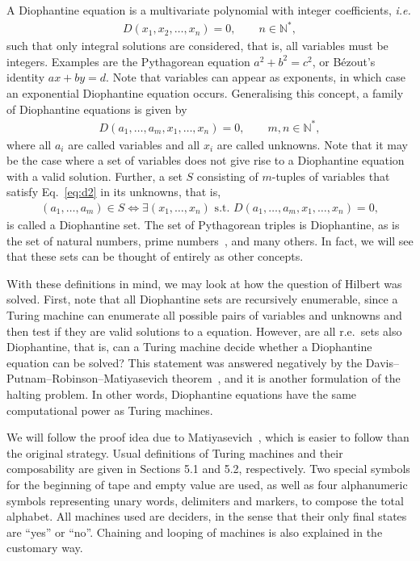\documentclass[12pt]{article}
\begin{document}
A Diophantine equation is a multivariate polynomial with integer coefficients,
\emph{i.e.}
\begin{align}
    D(x_{1}, x_{2}, \dots, x_{n}) = 0, \qquad n \in \mathbb{N}^{*},
        \label{eq:d1}
\end{align}
such that only integral solutions are considered, that is, all variables must
be integers. Examples are the Pythagorean equation $a^{2} + b^{2} = c^{2}$, or
Bézout's identity $ax + by = d$. Note that variables can appear as exponents,
in which case an exponential Diophantine equation occurs. Generalising this
concept, a family of Diophantine equations is given by
\begin{align}
    D(a_{1}, \dots, a_{m}, x_{1}, \dots, x_{n}) = 0, \qquad m, n \in
        \mathbb{N}^{*}, \label{eq:d2}
\end{align}
where all $a_{i}$ are called variables and all $x_{i}$ are called unknowns.
Note that it may be the case where a set of variables does not give rise to a
Diophantine equation with a valid solution. Further, a set $S$ consisting of
$m$-tuples of variables that satisfy Eq.~\ref{eq:d2} in its unknowns, that is,
\begin{align}
    (a_{1}, \dots, a_{m}) \in S \Leftrightarrow \exists (x_{1}, \dots, x_{n})
        \text{ s.t. } D(a_{1}, \dots, a_{m}, x_{1}, \dots, x_{n}) = 0,
\end{align}
is called a Diophantine set. The set of Pythagorean triples is Diophantine, as
is the set of natural numbers, prime numbers~\cite{Jones:article:1976:jun}, and
many others. In fact, we will see that these sets can be thought of entirely as
other concepts.

With these definitions in mind, we may look at how the question of Hilbert was
solved. First, note that all Diophantine sets are recursively enumerable, since
a Turing machine can enumerate all possible pairs of variables and unknowns and
then test if they are valid solutions to a equation. However, are all r.e.\ sets
also Diophantine, that is, can a Turing machine decide whether a Diophantine
equation can be solved? This statement was answered negatively by the
Davis--Putnam--Robinson--Matiyasevich
theorem~\cite{Matiyasevich:article:1970:jun}, and it is another formulation of
the halting problem. In other words, Diophantine equations have the same
computational power as Turing machines.

We will follow the proof idea due to Matiyasevich~\cite[Chap.
5]{Matiyasevich:book:1993}, which is easier to follow than the original
strategy. Usual definitions of Turing machines and their composability are
given in Sections 5.1 and 5.2, respectively. Two special symbols for the
beginning of tape and empty value are used, as well as four alphanumeric
symbols representing unary words, delimiters and markers, to compose the total
alphabet. All machines used are deciders, in the sense that their only final
states are ``yes'' or ``no''. Chaining and looping of machines is also
explained in the customary way.
\end{document}
